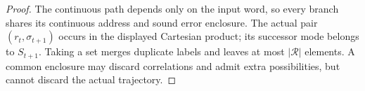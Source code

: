 \begin{proof}
The continuous path depends only on the input word, so every branch shares
its continuous address and sound error enclosure. The actual pair
$(r_t,\sigma_{t+1})$ occurs in the displayed Cartesian product; its successor
mode belongs to $S_{t+1}$. Taking a set merges duplicate labels and leaves
at most $|\mathcal R|$ elements. A common enclosure may discard correlations
and admit extra possibilities, but cannot discard the actual trajectory.
\end{proof}
